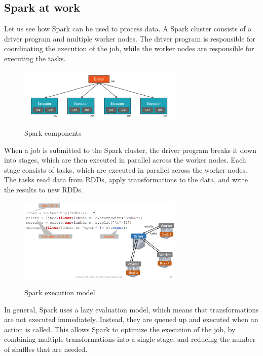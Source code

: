 \subsection{Spark at work}

Let us see how Spark can be used to process data. A Spark cluster consists of a driver program and
multiple worker nodes. The driver program is responsible for coordinating the execution of the job,
while the worker nodes are responsible for executing the tasks.

\begin{figure}[H]
    \centering
    \includegraphics[width=0.7\textwidth]{figures/spark_components.png}
    \label{fig:spark_cluster}
    \caption{Spark components}
\end{figure}

When a job is submitted to the Spark cluster, the driver program breaks it down into stages, which are
then executed in parallel across the worker nodes. Each stage consists of tasks, which are executed
in parallel across the worker nodes. The tasks read data from RDDs, apply transformations to the data,
and write the results to new RDDs.

\begin{figure}[H]
    \centering
    \includegraphics[width=0.7\textwidth]{figures/spark_execution.png}
    \label{fig:spark_execution}
    \caption{Spark execution model}
\end{figure}

In general, Spark uses a lazy evaluation model, which means that transformations are not executed
immediately. Instead, they are queued up and executed when an action is called. This allows Spark to
optimize the execution of the job, by combining multiple transformations into a single stage, and
reducing the number of shuffles that are needed.\\

